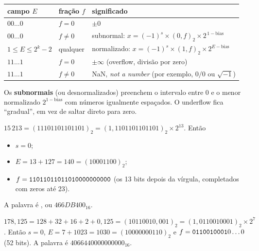 \begin{center}
\begin{tabular}{lll}
\toprule
campo $E$ & fração $f$ & significado\\
\midrule
$00\dots0$ & $f=0$     & $\pm0$\\
$00\dots0$ & $f\neq0$  & subnormal: $x=(-1)^s\times(0{,}f)_2\times2^{\,1-\text{bias}}$\\
$1\le E\le 2^k-2$ & qualquer & normalizado: $x=(-1)^s\times(1{,}f)_2\times2^{E-\text{bias}}$\\
$11\dots1$ & $f=0$     & $\pm\infty$ (overflow, divisão por zero)\\
$11\dots1$ & $f\neq0$  & NaN, \emph{not a number} (por exemplo, $0/0$ ou $\sqrt{-1}$)\\
\bottomrule
\end{tabular}
\end{center}

Os \textbf{subnormais} (ou desnormalizados) preenchem o intervalo entre $0$ e o menor normalizado
$2^{1-\text{bias}}$ com números igualmente espaçados. O underflow fica ``gradual'', em vez de saltar
direto para zero.

\begin{exemplo}
$15\,213=(11101101101101)_2=(1{,}1101101101101)_2\times2^{13}$. Então
\begin{itemize}[nosep]
  \item $s=0$;
  \item $E=13+127=140=(10001100)_2$;
  \item $f=\texttt{11011011011010000000000}$ (os 13 bits depois da vírgula, completados com zeros até 23).
\end{itemize}
A palavra é , ou $466DB400_{16}$.
\end{exemplo}

\begin{exemplo}
$178{,}125=128+32+16+2+0{,}125=(10110010{,}001)_2=(1{,}0110010001)_2\times2^{7}$. Então
$s=0$, $E=7+1023=1030=(10000000110)_2$ e $f=\texttt{0110010001}0\dots0$ (52 bits).
A palavra é $4066440000000000_{16}$.
\end{exemplo}


